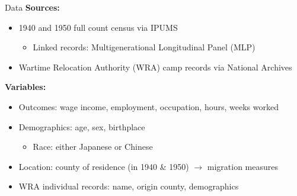 \documentclass{beamer}
\begin{document}

\begin{frame}{Data}\label{data}
    \textbf{Sources:} 
    \begin{itemize}
        \item 1940 and 1950 full count census via IPUMS
          \begin{itemize}
            \item Linked records: Multigenerational Longitudinal Panel (MLP)
          \end{itemize}
        \item Wartime Relocation Authority (WRA) camp records via National Archives
    \end{itemize}
    \textbf{Variables:}
    \begin{itemize}
    \item Outcomes: wage income, employment, occupation, hours, weeks worked
    \item Demographics: age, sex, birthplace
    \begin{itemize}
      \item Race: either Japanese or Chinese
    \end{itemize}
    \item Location: county of residence (in 1940 \& 1950) $\rightarrow$ migration measures
    \item WRA individual records: name, origin county, demographics
    \end{itemize}
  \hyperlink{sumstats}{}
\end{frame}
\end{document}
